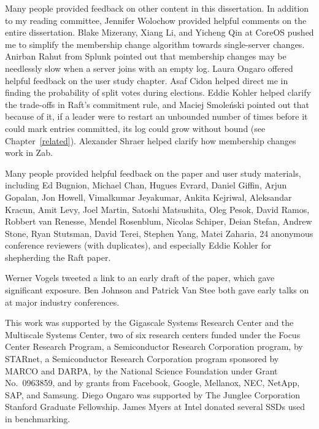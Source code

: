 Many people provided feedback on other content in this dissertation.
In addition to my reading committee, Jennifer Wolochow provided helpful comments
on the entire dissertation.
Blake Mizerany, Xiang Li, and Yicheng Qin at CoreOS pushed
me to simplify the membership change algorithm towards
single-server changes.
Anirban Rahut from Splunk pointed out that membership changes may be
needlessly slow when a server joins with an empty log.
Laura Ongaro offered helpful feedback on the
user study chapter. Asaf Cidon helped direct me in finding the
probability of split votes during elections.
Eddie Kohler helped clarify the trade-offs in Raft's commitment rule,
and Maciej Smole\'{n}ski pointed out that because of it, if a leader
were to restart an unbounded number of times before it could mark entries
committed, its log could grow without bound (see Chapter~\ref{related}).
Alexander Shraer helped clarify how membership changes work in Zab.

Many people provided helpful feedback on the \name{} paper and user study
materials, including
Ed Bugnion,
Michael Chan,
Hugues Evrard,
Daniel Giffin,
Arjun Gopalan,
Jon Howell,
Vimalkumar Jeyakumar,
Ankita Kejriwal,
Aleksandar Kracun,
Amit Levy,
Joel Martin,
Satoshi Matsushita,
Oleg Pesok,
David Ramos,
Robbert van Renesse,
Mendel Rosenblum,
Nicolas Schiper,
Deian Stefan,
Andrew Stone,
Ryan Stutsman,
David Terei,
Stephen Yang,
Matei Zaharia,
24 anonymous conference reviewers (with duplicates),
and especially Eddie Kohler for shepherding the Raft paper.

Werner Vogels tweeted a link to an early draft of the \name{} paper,
which gave \name{} significant exposure. Ben Johnson and Patrick Van
Stee both gave early talks on \name{} at major industry conferences.

This work was supported by the Gigascale Systems Research Center and the
Multiscale Systems Center, two of six research centers funded under the Focus
Center Research Program, a Semiconductor Research Corporation program,
by STARnet, a Semiconductor Research Corporation program sponsored by MARCO
and DARPA, by the National Science Foundation under Grant No.~0963859,
and by grants from Facebook, Google, Mellanox, NEC, NetApp, SAP, and Samsung.
Diego Ongaro was supported by The Junglee Corporation Stanford Graduate
Fellowship. James Myers at Intel donated several SSDs used in
benchmarking.
